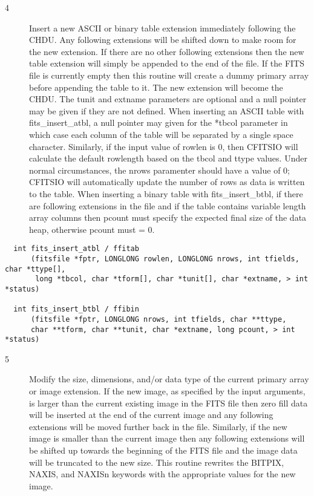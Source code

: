 \documentclass[11pt]{book}
\begin{document}
\begin{description}
\item[4 ] Insert a new ASCII or binary table extension immediately following the CHDU.
    Any following extensions will be shifted down to make room for the
    new extension.  If there are no other following extensions then the
    new table extension will simply be appended to the end of the
    file.   If the FITS file is currently empty then this routine will
    create a dummy primary array before appending the table to it. The
    new extension will become the CHDU.  The tunit and extname
    parameters are optional and a null pointer may be given if they are
    not defined.  When inserting an ASCII table with
    fits\_insert\_atbl, a null pointer  may given for the *tbcol
    parameter in which case each column of the table will be separated
    by a single space character. Similarly, if the input value of
    rowlen is  0, then CFITSIO will calculate the default rowlength
    based on the tbcol and ttype values.  Under normal circumstances,
    the nrows
    paramenter should have a value of 0; CFITSIO will automatically update
    the number of rows as data is written to the table.  When inserting a binary table
    with fits\_insert\_btbl, if there are following extensions in the
    file and if the table contains variable length array columns then
    pcount must specify the expected final size of the data heap,
   otherwise pcount must = 0. \label{ffitab} \label{ffibin}
\end{description}

\begin{verbatim}
  int fits_insert_atbl / ffitab
      (fitsfile *fptr, LONGLONG rowlen, LONGLONG nrows, int tfields, char *ttype[],
       long *tbcol, char *tform[], char *tunit[], char *extname, > int *status)

  int fits_insert_btbl / ffibin
      (fitsfile *fptr, LONGLONG nrows, int tfields, char **ttype,
      char **tform, char **tunit, char *extname, long pcount, > int *status)
\end{verbatim}

\begin{description}
\item[5 ] Modify the size, dimensions, and/or data type of the current
    primary array or image extension. If the new image, as specified
    by the input arguments, is larger than the current existing image
    in the FITS file then zero fill data will be inserted at the end
    of the current image and any following extensions will be moved
    further back in the file.  Similarly, if the new image is
    smaller than the current image then any following extensions
    will be shifted up towards the beginning of the FITS file
    and the image data will be truncated to the new size.
    This routine rewrites the BITPIX, NAXIS, and NAXISn keywords
   with the appropriate values for the new image. \label{ffrsim}
\end{description}
\end{document}
